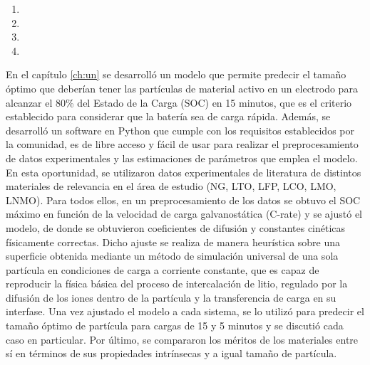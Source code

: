 \begin{enumerate}
    \item {}
    \item {}
    \item {}
    \item {}
\end{enumerate}

En el capítulo \ref{ch:un} se desarrolló un modelo que permite predecir el tamaño
óptimo que deberían tener las partículas de material activo en un electrodo para 
alcanzar el 80\% del Estado de la Carga (SOC) en 15 minutos, que es el criterio
establecido para considerar que la batería sea de carga rápida. Además, se 
desarrolló un software en Python que cumple con los requisitos establecidos por 
la comunidad, es de libre acceso y fácil de usar para realizar el preprocesamiento
de datos experimentales y las estimaciones de parámetros que emplea el modelo. En esta oportunidad, se 
utilizaron datos experimentales de literatura de distintos materiales de 
relevancia en el área de estudio (NG, LTO, LFP, LCO, LMO, LNMO). Para todos ellos,
en un preprocesamiento de los datos se obtuvo el SOC máximo en función de la 
velocidad de carga galvanostática (C-rate) y se ajustó el modelo, de donde 
se obtuvieron coeficientes de difusión y constantes cinéticas físicamente 
correctas. Dicho ajuste se realiza de manera heurística sobre una superficie 
obtenida mediante un método de simulación universal de una sola partícula en 
condiciones de carga a corriente constante, que es capaz de reproducir la física 
básica del proceso de intercalación de litio, regulado por la difusión de los 
iones dentro de la partícula y la transferencia de carga en su interfase.
Una vez ajustado el modelo a cada sistema, se lo utilizó para predecir el tamaño
óptimo de partícula para cargas de 15 y 5 minutos y se discutió cada caso en 
particular. Por último, se compararon los méritos de los materiales entre sí en 
términos de sus propiedades intrínsecas y a igual tamaño de partícula.

